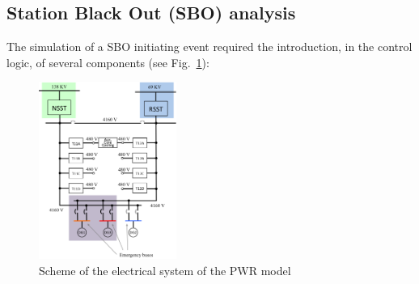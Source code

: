 \subsection{Station Black Out (SBO) analysis} 
\label{sec:SBOanalysis}
The simulation of a SBO initiating event required the introduction, in the control logic, of several components (see Fig.~\ref{fig:SchemeElSystem}):
\begin{figure}[h]
   \centering
    \includegraphics[width=0.4\textwidth]{figures/SchemeEletricalSystem.png}
    \caption{Scheme of the electrical system of the PWR model}
    \label{fig:SchemeElSystem}
\end{figure}

